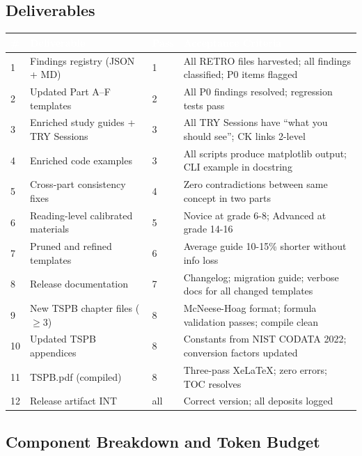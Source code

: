 \documentclass[11pt,letterpaper]{article}
\newcommand{\tableheader}[1]{\textbf{\sffamily\textcolor{white}{#1}}}
\begin{document}
\subsection{Deliverables}

\begin{center}
\begin{tabularx}{\textwidth}{C{0.4cm}L{5cm}C{1.5cm}X}
\toprule
{}
\tableheader{\#} & \tableheader{Deliverable} & \tableheader{Pass} & \tableheader{Acceptance Criteria} \\
 & Findings registry (JSON + MD) & 1 & All RETRO files harvested; all findings classified; P0 items flagged \\
2 & Updated Part A--F templates & 2 & All P0 findings resolved; regression tests pass \\
3 & Enriched study guides + TRY Sessions & 3 & All TRY Sessions have ``what you should see''; CK links 2-level \\
4 & Enriched code examples & 3 & All scripts produce matplotlib output; CLI example in docstring \\
5 & Cross-part consistency fixes & 4 & Zero contradictions between same concept in two parts \\
6 & Reading-level calibrated materials & 5 & Novice at grade 6-8; Advanced at grade 14-16 \\
7 & Pruned and refined templates & 6 & Average guide 10-15\% shorter without info loss \\
8 & Release documentation & 7 & Changelog; migration guide; verbose docs for all changed templates \\
9 & New TSPB chapter files ($\geq$3) & 8 & McNeese-Hoag format; formula validation passes; compile clean \\
10 & Updated TSPB appendices & 8 & Constants from NIST CODATA 2022; conversion factors updated \\
11 & TSPB.pdf (compiled) & 8 & Three-pass XeLaTeX; zero errors; TOC resolves \\
12 & Release artifact INT & all & Correct version; all deposits logged \\
\bottomrule
\end{tabularx}
\end{center}

\subsection{Component Breakdown and Token Budget}
\end{document}
